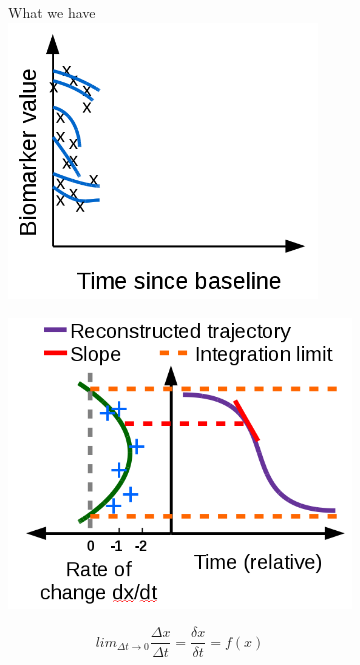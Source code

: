 \begin{figure}[h]
\begin{subfigure}{0.3\textwidth}
     \vspace{1em}
 \end{subfigure}
 \begin{subfigure}{0.3\textwidth}
     \centering
     What we have\\
     \vspace{1em}
     \includegraphics[width=0.90\textwidth,trim= 0 0 0 30]{images/demNewFigs/fig3.png}
     \vspace{1em}
 \end{subfigure}
 
 \begin{subfigure}{0.34\textwidth}
    \centering
    \includegraphics[width=\textwidth]{images/demNewFigs/fig5.png}
    \vspace{1em}
 \end{subfigure}
  \begin{subfigure}{0.3\textwidth}
  \centering
  \vspace{-3.5em}
  $$
  lim_{\Delta t \xrightarrow{}  0} \frac{\Delta x}{\Delta t} = \frac{\delta x}{\delta t} = f(x)
  $$
  

\end{subfigure}
\end{figure}
